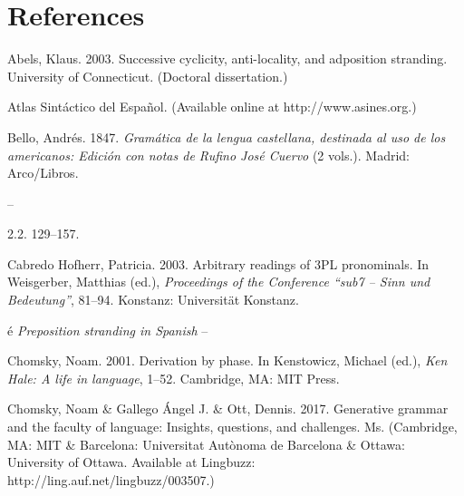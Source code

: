 \documentclass[output=paper]{langsci/langscibook}
\begin{document}
\section{ References}

Abels, Klaus. 2003. Successive cyclicity, anti-locality, and adposition stranding. University of Connecticut. (Doctoral dissertation.)

Atlas Sintáctico del Español. (Available online at http://www.asines.org.)

Bello, Andrés. 1847. \textit{Gramática de la lengua castellana, destinada al uso de los americanos: Edición con notas de Rufino José Cuervo} (2 vols.). Madrid: Arco/Libros.

\begin{styleBodyTextIn}
  –
\end{styleBodyTextIn}

\begin{styleBodyTextIn}
 \textstylest{} 2.2. 129–157.
\end{styleBodyTextIn}

\begin{styleBodyTextIn}
Cabredo Hofherr, Patricia. 2003. Arbitrary readings of 3PL pronominals. In Weisgerber, Matthias (ed.), \textit{Proceedings of the Conference “sub7 – Sinn und Bedeutung”}, 81–94. Konstanz: Universität Konstanz.
\end{styleBodyTextIn}

\begin{styleBodyTextIn}
é \emph{Preposition stranding in Spanish} –
\end{styleBodyTextIn}

\begin{styleBodyTextIn}
Chomsky, Noam. 2001. Derivation by phase. In Kenstowicz, Michael (ed.), \textit{Ken Hale: A life in language}, 1–52. Cambridge, MA: MIT Press.
\end{styleBodyTextIn}

\begin{styleBodyTextIn}
Chomsky, Noam \& Gallego Ángel J. \& Ott, Dennis. 2017. Generative grammar and the faculty of language: Insights, questions, and challenges. Ms. (Cambridge, MA: MIT \& Barcelona: Universitat Autònoma de Barcelona \& Ottawa: University of Ottawa. Available at Lingbuzz: http://ling.auf.net/lingbuzz/003507.)
\end{styleBodyTextIn}
\end{document}

